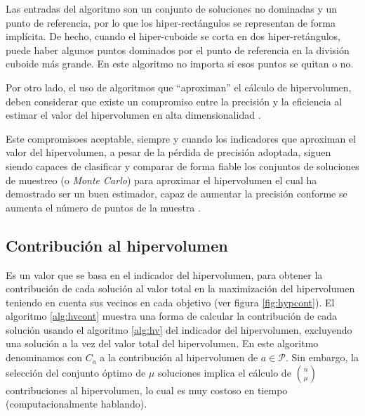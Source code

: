   Las entradas del algoritmo son un conjunto de soluciones no dominadas y un punto de referencia, por lo que los 
  hiper-rect\'angulos se representan de forma impl\'icita. De hecho, cuando el hiper-cuboide se corta en dos  
  hiper-ret\'angulos, puede haber algunos puntos dominados por el punto de referencia en la divisi\'on cuboide m\'as 
  grande. En este algoritmo no importa si esos puntos se quitan o no. 

  Por otro lado, el uso de algoritmos que ``aproximan'' el c\'alculo de hipervolumen, deben considerar que existe un compromiso
  entre la precisi\'on y la eficiencia al estimar el valor del hipervolumen en alta dimensionalidad \cite{Braberman07, bdz2008a}.

  Este compromiso\DIFaddbegin {}\cite{Bader11}\DIFadd{, }\DIFaddend es aceptable, siempre y cuando los indicadores que aproximan el valor del hipervolumen, a 
  pesar de la p\'erdida de precisi\'on adoptada, siguen siendo capaces de  clasificar y comparar de forma fiable los conjuntos de soluciones\DIFdelbegin %
\DIFdelend \DIFaddbegin {}\cite{Everson02fullelite} \DIFaddend de muestreo (o \textit{Monte Carlo}) para aproximar el hipervolumen el cual ha 
  demostrado ser un buen estimador, capaz de aumentar la precisi\'on conforme se aumenta el n\'umero de puntos de la muestra\DIFdelbegin %
\DIFdelend . 

  \subsection{Contribuci\'on al hipervolumen}

  Es un valor que se basa en el indicador del hipervolumen, para obtener  
  la contribuci\'on de cada soluci\'on al valor total en la maximizaci\'on del hipervolumen teniendo en cuenta sus vecinos en cada 
  objetivo (ver figura \ref{fig:hypcont}). El algoritmo \ref{alg:hvcont} muestra una forma de calcular la contribuci\'on 
  de cada soluci\'on usando el algoritmo \ref{alg:hv} del indicador del hipervolumen, excluyendo una soluci\'on a la vez
  del valor total del hipervolumen. En este algoritmo denominamos con $C_a$ a la contribuci\'on al hipervolumen de $a \in \mathcal{P}$.
  Sin embargo, la selecci\'on del conjunto \'optimo de $\mu$ soluciones implica el c\'alculo de ${n \choose \mu}$ contribuciones al 
  hipervolumen, lo cual es muy costoso en tiempo (computacionalmente hablando).

